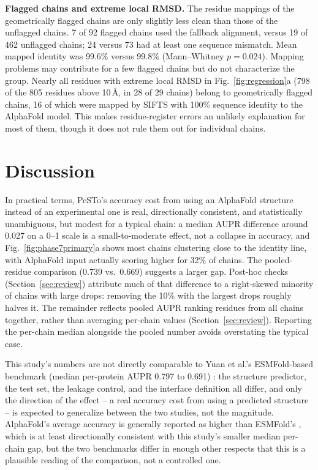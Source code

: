 \documentclass[10pt]{article}
\begin{document}
\textbf{Flagged chains and extreme local RMSD.} The residue mappings of
the geometrically flagged chains are only slightly less clean than those
of the unflagged chains. 7 of
92 flagged chains used the fallback alignment, versus
19 of 462 unflagged chains;
24 versus 73 had at least one sequence mismatch.
Mean mapped identity was 99.6\% versus 99.8\%
(Mann--Whitney $p = 0.024$). Mapping problems may contribute for a few
flagged chains but do not characterize the group. Nearly all residues with extreme local RMSD in
Fig.~\ref{fig:regression}a
(798 of the 805 residues above 10\,\r{A},
in 28 of 29 chains) belong to geometrically
flagged chains, 16 of which were mapped by SIFTS with
100\% sequence identity to the AlphaFold model. This makes residue-register
errors an unlikely explanation for most of them, though it does not rule
them out for individual chains.

\section{Discussion}

In practical terms, PeSTo's accuracy cost from using an AlphaFold structure
instead of an experimental one is real, directionally consistent, and
statistically unambiguous, but modest for a typical chain: a median AUPR
difference around 0.027 on a 0--1 scale is a small-to-moderate
effect, not a collapse in accuracy, and Fig.~\ref{fig:phase7primary}a shows
most chains clustering close to the identity line, with AlphaFold input
actually scoring higher for 32\% of chains. The pooled-residue
comparison (0.739 vs.\ 0.669) suggests a larger
gap. Post-hoc checks (Section~\ref{sec:review}) attribute much of that difference to a right-skewed
minority of chains with large drops: removing the 10\% with the
largest drops roughly halves it. The remainder reflects pooled AUPR ranking
residues from all chains together, rather than averaging per-chain values
(Section~\ref{sec:review}).
Reporting the per-chain median alongside the pooled number avoids
overstating the typical case.

This study's numbers are not directly comparable to Yuan et al.'s
ESMFold-based benchmark (median per-protein AUPR 0.797 to 0.691)
\cite{yuan2024}: the structure predictor, the test set, the leakage control,
and the interface definition all differ, and only the direction of the effect
-- a real accuracy cost from using a predicted structure -- is expected to
generalize between the two studies, not the magnitude. AlphaFold's average
accuracy is generally reported as higher than ESMFold's \cite{lin2023}, which
is at least directionally consistent with this study's smaller median
per-chain gap, but the two benchmarks differ in enough other respects that
this is a plausible reading of the comparison, not a controlled one.
\end{document}

